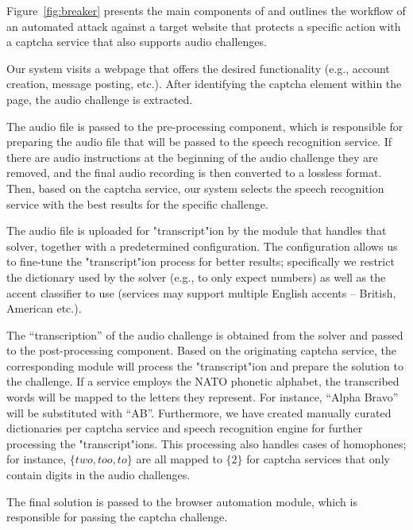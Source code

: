 Figure~\ref{fig:breaker} presents the main components of \system and outlines the workflow of
an automated attack against a target website that protects a specific action with a captcha 
service that also supports audio challenges.

\protect{} Our system visits a webpage that offers the desired functionality 
(e.g., account creation, message posting, etc.). After identifying the captcha element within 
the page, the audio challenge is extracted.

\protect{} The audio file is passed to the pre-processing component, which is responsible 
for preparing the audio file that will be passed to the speech recognition service. If there are audio 
instructions at the beginning of the audio challenge they are removed, and the final audio
recording is then converted to a lossless format. Then, based on the captcha service, our system
selects the speech recognition service with the best results for the specific challenge.

\protect{} The audio file is uploaded for "transcript"ion by the module that handles that solver, 
together with a predetermined configuration. The configuration allows us to fine-tune the "transcript"ion process
for better results; specifically we restrict the dictionary used by the solver (e.g., to only expect  
numbers) as well as the accent classifier to use (services may support multiple English accents 
-- British, American etc.).

\protect{} The ``transcription'' of the audio challenge is obtained from the solver 
and passed to the post-processing component. Based on the originating captcha service, the corresponding  
module will process the "transcript"ion and prepare the solution to the challenge. If a service employs the 
NATO phonetic alphabet, the transcribed words will be mapped to the letters they represent. For instance, 
``Alpha Bravo'' will be substituted with ``AB''. Furthermore, we have created manually curated dictionaries
per captcha service and speech recognition engine for further processing the "transcript"ions. This processing
also handles cases of homophones; for instance, $\{two,too,to\}$ are all
mapped to $\{2\}$ for captcha services that only contain digits in the audio challenges.

\protect{} The final solution is passed to the browser automation module,
which is responsible for passing the captcha challenge.


